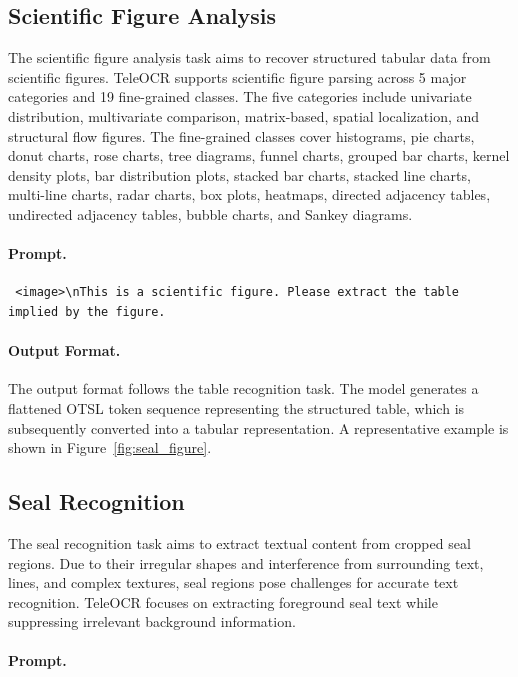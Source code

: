 \documentclass{fairmeta}
\begin{document}
\subsection{Scientific Figure Analysis}
\label{app:Scientific_Figure_Analysis}
The scientific figure analysis task aims to recover structured tabular data from scientific figures. TeleOCR supports scientific figure parsing across 5 major categories and 19 fine-grained classes. The five categories include univariate distribution, multivariate comparison, matrix-based, spatial localization, and structural flow figures. The fine-grained classes cover histograms, pie charts, donut charts, rose charts, tree diagrams, funnel charts, grouped bar charts, kernel density plots, bar distribution plots, stacked bar charts, stacked line charts, multi-line charts, radar charts, box plots, heatmaps, directed adjacency tables, undirected adjacency tables, bubble charts, and Sankey diagrams.

\paragraph{Prompt.}

\begin{verbatim} <image>\nThis is a scientific figure. Please extract the table implied by the figure.
\end{verbatim}

\paragraph{Output Format.}

The output format follows the table recognition task. The model generates a flattened OTSL token sequence representing the structured table, which is subsequently converted into a tabular representation. A representative example is shown in Figure~\ref{fig:seal_figure}.


\subsection{Seal Recognition}
\label{app:Seal_Recognition}
The seal recognition task aims to extract textual content from cropped seal regions. Due to their irregular shapes and interference from surrounding text, lines, and complex textures, seal regions pose challenges for accurate text recognition. TeleOCR focuses on extracting foreground seal text while suppressing irrelevant background information.

\paragraph{Prompt.}
\end{document}
